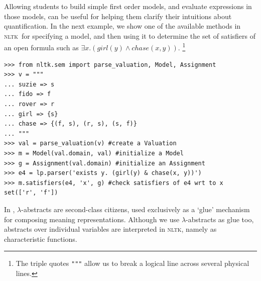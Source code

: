 \documentclass[11pt, a4paper]{article}
\newcommand{\NLTK}{\textsc{nltk}}
\begin{document}
Allowing students to build simple first order models, and evaluate
expressions in those models, can be useful for helping them clarify
their intuitions about quantification. In the next example, we show
one of the available methods in \NLTK\ for specifying a model, and
then using it to determine the set of satisfiers of an open formula
such as %
$\exists x.(\mathit{girl}(y) \wedge \mathit{chase}(x,y))$.%
\footnote{The triple
  quotes \texttt{"""} allow us to break a logical line across several physical
  lines.}
\begin{Verbatim}
>>> from nltk.sem import parse_valuation, Model, Assignment
>>> v = """
... suzie => s
... fido => f
... rover => r
... girl => {s}
... chase => {(f, s), (r, s), (s, f)}
... """
>>> val = parse_valuation(v) #create a Valuation
>>> m = Model(val.domain, val) #initialize a Model
>>> g = Assignment(val.domain) #initialize an Assignment
>>> e4 = lp.parser('exists y. (girl(y) & chase(x, y))')
>>> m.satisfiers(e4, 'x', g) #check satisfiers of e4 wrt to x
set(['r', 'f'])
\end{Verbatim}

In \citet{BB}, $\lambda$-abstracts are second-class citizens, used
exclusively as a `glue' mechanism for composing meaning
representations. Although we use $\lambda$-abstracts as glue too,
abstracts over individual variables are interpreted in \NLTK, namely as
characteristic functions.
\end{document}
